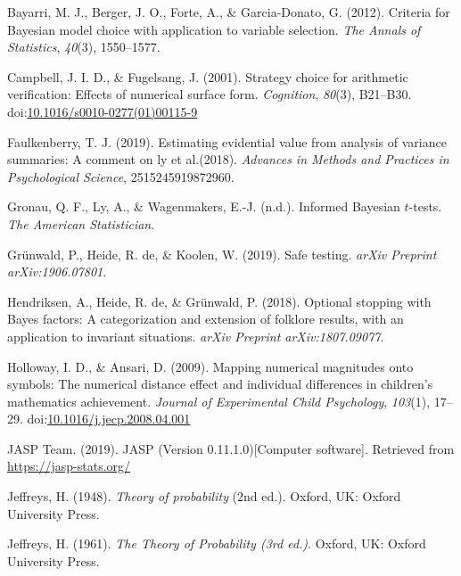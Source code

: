 \documentclass[english,,doc,floatsintext]{apa6}
\begin{document}
\leavevmode\hypertarget{ref-bayarri2012criteria}{}%
Bayarri, M. J., Berger, J. O., Forte, A., \& Garcia-Donato, G. (2012). Criteria for Bayesian model choice with application to variable selection. \emph{The Annals of Statistics}, \emph{40}(3), 1550--1577.

\leavevmode\hypertarget{ref-campbellFugelsang2001}{}%
Campbell, J. I. D., \& Fugelsang, J. (2001). Strategy choice for arithmetic verification: Effects of numerical surface form. \emph{Cognition}, \emph{80}(3), B21--B30. doi:\href{https://doi.org/10.1016/s0010-0277(01)00115-9}{10.1016/s0010-0277(01)00115-9}

\leavevmode\hypertarget{ref-faulkenberry2019estimating}{}%
Faulkenberry, T. J. (2019). Estimating evidential value from analysis of variance summaries: A comment on ly et al.(2018). \emph{Advances in Methods and Practices in Psychological Science}, 2515245919872960.

\leavevmode\hypertarget{ref-gronauInpressinformed}{}%
Gronau, Q. F., Ly, A., \& Wagenmakers, E.-J. (n.d.). Informed Bayesian \(t\)-tests. \emph{The American Statistician}.

\leavevmode\hypertarget{ref-grunwald2019safe}{}%
Grünwald, P., Heide, R. de, \& Koolen, W. (2019). Safe testing. \emph{arXiv Preprint arXiv:1906.07801}.

\leavevmode\hypertarget{ref-hendriksen2018optional}{}%
Hendriksen, A., Heide, R. de, \& Grünwald, P. (2018). Optional stopping with Bayes factors: A categorization and extension of folklore results, with an application to invariant situations. \emph{arXiv Preprint arXiv:1807.09077}.

\leavevmode\hypertarget{ref-hollowayAnsari2009}{}%
Holloway, I. D., \& Ansari, D. (2009). Mapping numerical magnitudes onto symbols: The numerical distance effect and individual differences in children's mathematics achievement. \emph{Journal of Experimental Child Psychology}, \emph{103}(1), 17--29. doi:\href{https://doi.org/10.1016/j.jecp.2008.04.001}{10.1016/j.jecp.2008.04.001}

\leavevmode\hypertarget{ref-jaspSoftware}{}%
JASP Team. (2019). JASP (Version 0.11.1.0){[}Computer software{]}. Retrieved from \url{https://jasp-stats.org/}

\leavevmode\hypertarget{ref-jeffreys1948theory2}{}%
Jeffreys, H. (1948). \emph{Theory of probability} (2nd ed.). Oxford, UK: Oxford University Press.

\leavevmode\hypertarget{ref-jeffreys1961}{}%
Jeffreys, H. (1961). \emph{The Theory of Probability (3rd ed.)}. Oxford, UK: Oxford University Press.
\end{document}
